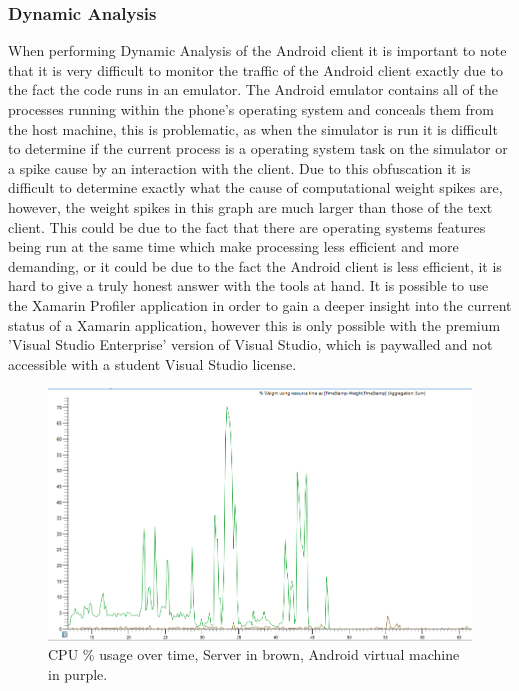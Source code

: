 \documentclass{article}
\begin{document}
\subsubsection{Dynamic Analysis}
When performing Dynamic Analysis of the Android client it is important to note that it is very difficult to monitor the traffic of the Android client exactly due to the fact the code runs in an emulator. The Android emulator contains all of the processes running within the phone's operating system and conceals them from the host machine, this is problematic, as when the simulator is run it is difficult to determine if the current process is a operating system task on the simulator or a spike cause by an interaction with the client. Due to this obfuscation it is difficult to determine exactly what the cause of computational weight spikes are, however, the weight spikes in this graph are much larger than those of the text client. This could be due to the fact that there are operating systems features being run at the same time which make processing less efficient and more demanding, or it could be due to the fact the Android client is less efficient, it is hard to give a truly honest answer with the tools at hand. It is possible to use the Xamarin Profiler application in order to gain a deeper insight into the current status of a Xamarin application, however this is only possible with the premium 'Visual Studio Enterprise' version of Visual Studio, which is paywalled and not accessible with a student Visual Studio license.
\begin{figure}[H]
	\caption{CPU \% usage over time, Server in brown, Android virtual machine in purple.}
	\begin{center}
		\includegraphics[width=\textwidth]{androidgraph.PNG}
	\end{center}
\end{figure}
\newpage
\end{document}
